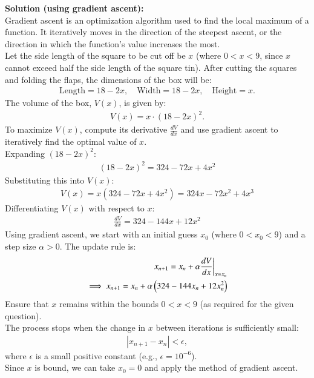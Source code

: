 \documentclass[journal]{IEEEtran}
\begin{document}
\textbf{Solution (using gradient ascent):} \\
Gradient ascent is an optimization algorithm used to find the local maximum of a function. It iteratively moves in the direction of the steepest ascent, or the direction in which the function's value increases the most. \\
Let the side length of the square to be cut off be $x$ (where $0 < x < 9$, since $x$ cannot exceed half the side length of the square tin). After cutting the squares and folding the flaps, the dimensions of the box will be:
\begin{align}
\text{Length} = 18 - 2x, \quad \text{Width} = 18 - 2x, \quad \text{Height} = x.
\end{align}
The volume of the box, $V(x)$, is given by: 
\begin{align}
V(x) = x \cdot (18 - 2x)^2.
\end{align}
To maximize $V(x)$, compute its derivative $\frac{dV}{dx}$ and use gradient ascent to iteratively find the optimal value of $x$. \\
Expanding $(18 - 2x)^2$:
\begin{align}
(18 - 2x)^2 = 324 - 72x + 4x^2
\end{align}
Substituting this into $V(x)$:
\begin{align}
V(x) = x(324 - 72x + 4x^2) = 324x - 72x^2 + 4x^3
\end{align}
Differentiating $V(x)$ with respect to $x$:
\begin{align}
\frac{dV}{dx} = 324 - 144x + 12x^2
\end{align}
Using gradient ascent, we start with an initial guess $x_0$ (where $0 < x_0 < 9$) and a step size $\alpha > 0$. The update rule is:
\begin{align}
x_{n+1} = x_n + \alpha \frac{dV}{dx}\bigg|_{x = x_n} \\
\implies x_{n+1} = x_n + \alpha \left(324 - 144x_n + 12x_n^2\right)
\end{align}
Ensure that $x$ remains within the bounds $0 < x < 9$ (as required for the given question). \\
The process stops when the change in $x$ between iterations is sufficiently small:
\begin{align}
|x_{n+1} - x_n| < \epsilon,
\end{align}
where $\epsilon$ is a small positive constant (e.g., $\epsilon = 10^{-6}$). \\
Since $x$ is bound, we can take $x_0 = 0$ and apply the method of gradient ascent.
\end{document}
